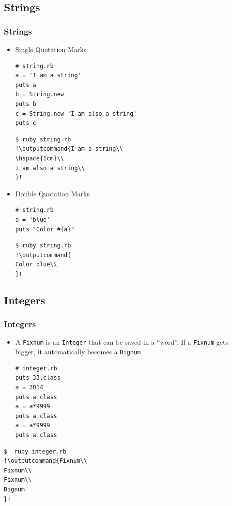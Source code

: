 \documentclass{beamer}
\newcommand{\outputcommand}[1]{\color{darkgreen}{#1}}
\begin{document}
\subsection{Strings}
\begin{frame}
\frametitle{Strings}
\begin{itemize}
 \item Single Quotation Marks
\lstset{language=Ruby, style=eclipse}
\begin{lstlisting}[escapechar=&]
# string.rb
a = 'I am a string'
puts a
b = String.new
puts b
c = String.new 'I am also a string'
puts c
\end{lstlisting}
\lstset{language=shell}
\begin{lstlisting}[numbers=none, escapechar=!]
$ ruby string.rb
!\outputcommand{I am a string\\
\hspace{1cm}\\
I am also a string\\
}!
\end{lstlisting}
 \item Double Quotation Marks
\lstset{language=Ruby, style=eclipse}
\begin{lstlisting}[escapechar=&]
# string.rb
a = 'blue'
puts "Color #{a}"
\end{lstlisting}
\lstset{language=shell}
\begin{lstlisting}[numbers=none, escapechar=!]
$ ruby string.rb
!\outputcommand{
Color blue\\
}!
\end{lstlisting}

\end{itemize}
\end{frame}
\subsection{Integers}
\begin{frame}[fragile]
\frametitle{Integers}
\begin{itemize}
 \item A \texttt{Fixnum} is an \texttt{Integer} that can be saved in a ``word''. If a \texttt{Fixnum} gets bigger, it automatically becomes a \texttt{Bignum}
\lstset{language=Ruby, style=eclipse}
\begin{lstlisting}[escapechar=&]
# integer.rb
puts 33.class
a = 2014
puts a.class
a = a*9999
puts a.class
a = a*9999
puts a.class
\end{lstlisting}
\end{itemize}
\lstset{language=shell}
\begin{lstlisting}[numbers=none, escapechar=!]
$  ruby integer.rb 
!\outputcommand{Fixnum\\
Fixnum\\
Fixnum\\
Bignum
}!
\end{lstlisting}
\end{frame}
\end{document}
